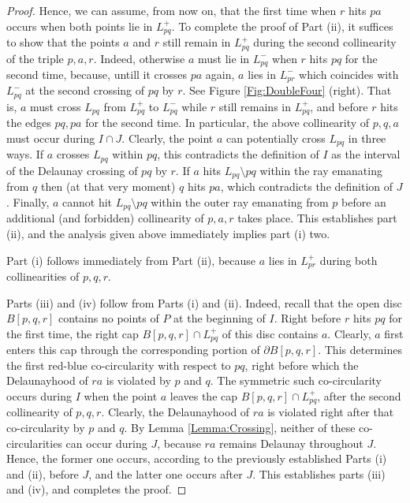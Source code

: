 \documentclass[letter,11pt]{article}
\def \L{{L}}
\begin{document}
\begin{proof}
Hence, we can assume, from now on, that the first time when $r$ hits $pa$ occurs when both points lie in $\L_{pq}^+$.
To complete the proof of Part (ii), it suffices to show that the points $a$ and $r$ still remain in $\L_{pq}^+$ during the second collinearity of the triple $p,a,r$.
Indeed, otherwise $a$ must lie in $\L_{pq}^-$ when $r$ hits $pq$ for the second time, because, untill it crosses $pa$ again, $a$ lies in $\L_{pr}^-$ which coincides with $\L_{pq}^-$ at the second crossing of $pq$ by $r$. See Figure \ref{Fig:DoubleFour} (right).
That is, $a$ must cross $\L_{pq}$ from $\L_{pq}^+$ to $\L_{pq}^-$ while $r$ still remains in $\L_{pq}^+$, and before $r$ hits the edges $pq,pa$ for the second time. In particular, the above collinearity of $p,q,a$ must occur during $I\cap J$. Clearly, the point $a$ can potentially cross $\L_{pq}$ in three ways.
If $a$ crosses $\L_{pq}$ within $pq$, this contradicts the definition of $I$ as the interval of the Delaunay crossing of $pq$ by $r$. If $a$ hits $\L_{pq}\setminus pq$ within the ray emanating from $q$ then (at that very moment) $q$ hits $pa$, which contradicts the definition of $J$. Finally, $a$ cannot hit $\L_{pq}\setminus pq$ within the outer ray emanating from $p$ before an additional (and forbidden) collinearity of $p,a,r$ takes place.  This establishes part (ii), and the analysis given above immediately implies part (i) two.

Part (i) follows immediately from Part (ii), because $a$ lies in $\L_{pr}^+$ during both collinearities of $p,q,r$.

Parts (iii) and (iv) follow from Parts (i) and (ii). Indeed, recall that the open disc $B[p,q,r]$ contains no points of $P$ at the beginning of $I$. Right before $r$ hits $pq$ for the first time, the right cap $B[p,q,r]\cap \L_{pq}^+$ of this disc contains $a$. Clearly, $a$ first enters this cap through the corresponding portion of $\partial B[p,q,r]$. This determines the first red-blue co-circularity with respect to $pq$, right before which the Delaunayhood of $ra$ is violated by $p$ and $q$. The symmetric such co-circularity occurs during $I$ when the point $a$ leaves the cap $B[p,q,r]\cap \L_{pq}^+$, after the second collinearity of $p,q,r$. Clearly, the Delaunayhood of $ra$ is violated right after that co-circularity by $p$ and $q$. By Lemma \ref{Lemma:Crossing}, neither of these co-circularities can occur during $J$, because $ra$ remains Delaunay throughout $J$. Hence, the former one occurs, according to the previously established Parts (i) and (ii), before $J$, and the latter one occurs after $J$. This establishes parts (iii) and (iv), and completes the proof.
\end{proof}
\end{document}
